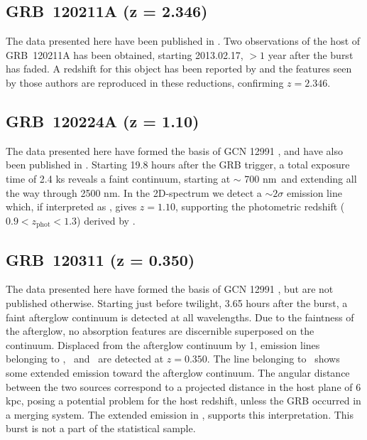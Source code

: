 \documentclass[longauth]{aa}    %
\begin{document}
\subsection{GRB~120211A (z = 2.346)} \label{120211}

The data presented here have been published in \citet{Kruhler2015}. Two
observations of the host of GRB~120211A has been obtained, starting 2013.02.17,
$> 1$ year after the burst has faded. A redshift for this object has been
reported by \citet{Kruhler2015} and the features seen by those authors are
reproduced in these reductions, confirming $z =	2.346$.

\subsection{GRB~120224A (z = 1.10)} \label{120224}

The data presented here have formed the basis of GCN 12991 \citep{GCN12991}, and
have also been published in \citet{Kruhler2015}. Starting 19.8 hours after the
GRB trigger, a total exposure time of 2.4 ks reveals a faint continuum, starting
at $\sim$ 700 nm~and extending all the way through 2500 nm. In the 2D-spectrum
we detect a $\sim 2 \sigma$ emission line which, if interpreted as \ha, gives $z
= 1.10$, supporting the photometric redshift ($0.9 < z_\mathrm{phot} < 1.3$)
derived by \citet{Kruhler2015}.

\subsection{GRB~120311 (z = 0.350)} \label{120311}

The data presented here have formed the basis of GCN 12991 \citep{GCN12991}, but
are not published otherwise. Starting just before twilight, 3.65 hours after the
burst, a faint afterglow continuum is detected at all wavelengths. Due to the
faintness of the afterglow, no absorption features are discernible superposed on
the continuum. Displaced from the afterglow continuum by 1, emission lines
belonging to \hb, \oiii~and \ha~are detected at $z = 0.350$. The line belonging
to \ha~shows some extended emission toward the afterglow continuum. The angular
distance between the two sources correspond to a projected distance in the host
plane of 6 kpc, posing a potential problem for the host redshift, unless the GRB
occurred in a merging system. The extended emission in \ha, supports this
interpretation. This burst is not a part of the statistical sample.
\end{document}

